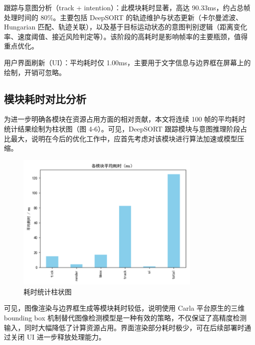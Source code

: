 跟踪与意图分析（track + intention）：此模块耗时显著，高达 90.33ms，约占总帧处理时间的 80\%。主要包括 DeepSORT 的轨迹维护与状态更新（卡尔曼滤波、Hungarian 匹配、轨迹关联），以及基于目标运动状态的意图判别逻辑（距离变化率、速度阈值、接近风险判定等）。该阶段的高耗时是影响帧率的主要瓶颈，值得重点优化。

用户界面刷新（UI）：平均耗时仅 1.00ms，主要用于文字信息与边界框在屏幕上的绘制，开销可忽略。

\subsection{模块耗时对比分析}

为进一步明确各模块在资源占用方面的相对贡献，本文将连续 100 帧的平均耗时统计结果绘制为柱状图（图 4-6）。可见，DeepSORT 跟踪模块与意图推理阶段占比最大，说明在今后的优化工作中，应首先考虑对该模块进行算法加速或模型压缩。

\begin{figure}[H]
    \centering
    \includegraphics[width=0.8\textwidth]{images/图12 耗时统计柱状图.pdf}  %
    \caption{耗时统计柱状图}
    \label{fig:example_image}  %
\end{figure}

可见，图像渲染与边界框生成等模块耗时较低，说明使用 Carla 平台原生的三维 bounding box 机制替代图像检测模型是一种有效的策略，不仅保证了高精度检测输入，同时大幅降低了计算资源占用。界面渲染部分耗时极少，可在后续部署时通过关闭 UI 进一步释放处理能力。


\begin{tabular}{l l}
\end{tabular}
